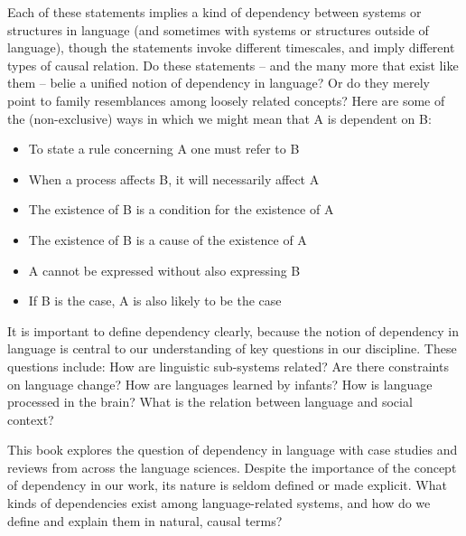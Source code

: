 \documentclass[output=paper]{langsci/langscibook}
\begin{document}

  Each of these statements implies a kind of dependency between systems or structures in language (and sometimes with systems or structures outside of language), though the statements invoke different timescales, and imply different types of causal relation. Do these statements -- and the many more that exist like them -- belie a unified notion of dependency in language? Or do they merely point to family resemblances among loosely related concepts? Here are some of the (non-exclusive) ways in which we might mean that A is dependent on B:

\begin{itemize}

\item To state a rule concerning A one must refer to B

\item When a process affects B, it will necessarily affect A

\item The existence of B is a condition for the existence of A

\item The existence of B is a cause of the existence of A

\item A cannot be expressed without also expressing B

\item If B is the case, A is also likely to be the case
\end{itemize}

It is important to define dependency clearly, because the notion of dependency in language is central to our understanding of key questions in our discipline. These questions include: How are linguistic sub-systems related? Are there constraints on language change? How are languages learned by infants? How is language processed in the brain? What is the relation between language and social context?  

This book explores the question of dependency in language with case studies and reviews from across the language sciences. Despite the importance of the concept of dependency in our work, its nature is seldom defined or made explicit. What kinds of dependencies exist among language-related systems, and how do we define and explain them in natural, causal terms? 
\end{document}
